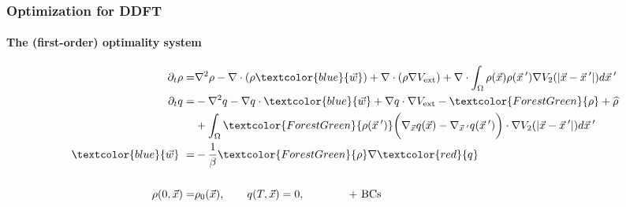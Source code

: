 \documentclass[aspectratio=169,xcolor=dvipsnames]{beamer}
\begin{document}
\begin{frame}
	\frametitle{Optimization for DDFT}
	\framesubtitle{The (first-order) optimality system}
	\begin{align*}
	 \partial_t \rho =& \nabla^2 \rho - \nabla \cdot (\rho \textcolor{blue}{\vec{w}}) + \nabla \cdot \left(\rho \nabla V_{\text{ext}} \right)
	+ \nabla \cdot \int_\Omega \rho(\vec{x}) \rho(\vec{x}\hspace{0.2em}') \nabla V_2(|\vec{x}-\vec{x}\hspace{0.2em}'|)d\vec{x}\hspace{0.2em}'  \\
	\partial_t q =& -\nabla^2 q - \nabla q \cdot \textcolor{blue}{\vec{w}} + \nabla q \cdot \nabla V_{\text{ext}} - \textcolor{ForestGreen}{\rho} + \widehat \rho \\
	&+ \int_\Omega \textcolor{ForestGreen}{\rho(\vec{x}\hspace{0.2em}')} \bigg(\nabla_{\vec{x}} q(\vec{x}) - \nabla_{\vec{x}\hspace{0.2em}'} q(\vec{x}\hspace{0.2em}')\bigg)\cdot  \nabla V_2(|\vec{x}-\vec{x}\hspace{0.2em}'|)d\vec{x}\hspace{0.2em}' \\
    \textcolor{blue}{\vec{w}} \ =& - \frac{1}{\beta}\textcolor{ForestGreen}{\rho} \nabla  \textcolor{red}{q}\\
    \\
    \rho(0,\vec{x})=&\rho_0(\vec{x}), \qquad q(T,\vec{x})= 0, \qquad \qquad \text{+ BCs}\\
	\end{align*}
\end{frame}
\end{document}
